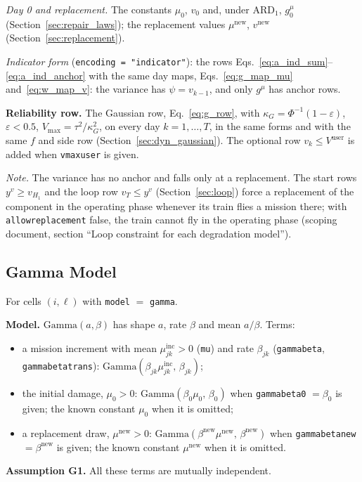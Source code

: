 \documentclass[11pt,a4paper]{article}
\theoremstyle{plain}
\theoremstyle{definition}
\newcommand{\ARDone}{\mathrm{ARD}_{1}}
\newcommand{\inc}{\mathrm{inc}}
\newcommand{\new}{\mathrm{new}}
\renewcommand{\_}{\textunderscore\allowbreak{}}
\begin{document}
\emph{Day 0 and replacement.} The constants $\mu_0$, $v_0$ and, under $\ARDone$,
$g^{\mu}_0$ (Section~\ref{sec:repair_laws}); the replacement values $\mu^{\new}$,
$v^{\new}$ (Section~\ref{sec:replacement}).

\emph{Indicator form} (\texttt{encoding = "indicator"}): the rows
Eqs.~\eqref{eq:a_ind_sum}--\eqref{eq:a_ind_anchor} with the same day maps,
Eqs.~\eqref{eq:g_map_mu} and~\eqref{eq:w_map_v}: the variance has
$\psi = v_{k-1}$, and only $g^{\mu}$ has anchor rows.

\textbf{Reliability row.} The Gaussian row, Eq.~\eqref{eq:g_row}, with
$\kappa_G = \Phi^{-1}(1-\varepsilon)$, $\varepsilon < 0.5$,
$V_{\max} = \tau^2/\kappa_G^2$, on every day $k = 1, \ldots, T$, in the same forms
and with the same $f$ and side row (Section~\ref{sec:dyn_gaussian}). The optional
row $v_k \leq V^{\mathrm{user}}$ is added when \texttt{v\_max\_user} is given.

\emph{Note.} The variance has no anchor and falls only at a replacement. The start rows
$y^v \geq v_{H_1}$ and the loop row $v_T \leq y^v$ (Section~\ref{sec:loop}) force a replacement of the component
in the operating phase whenever its train flies a mission there; with
\texttt{allow\_replacement} false, the train cannot fly in the operating phase
(scoping document, section ``Loop constraint for each degradation model'').

\subsection{Gamma Model}
\label{sec:dyn_gamma}

For cells $(i,\ell)$ with \texttt{model} $=$ \texttt{gamma}.

\textbf{Model.} $\mathrm{Gamma}(a, \beta)$ has shape $a$, rate $\beta$ and mean
$a/\beta$. Terms:
\begin{itemize}[leftmargin=1.5em, nosep]
  \item a mission increment with mean $\mu^{\inc}_{jk} > 0$ (\texttt{mu}) and rate
        $\beta_{jk}$ (\texttt{gamma\_beta}, \texttt{gamma\_beta\_trans}):
        $\mathrm{Gamma}(\beta_{jk}\mu^{\inc}_{jk},\, \beta_{jk})$;
  \item the initial damage, $\mu_0 > 0$: $\mathrm{Gamma}(\beta_0\mu_0,\, \beta_0)$
        when \texttt{gamma\_beta\_0} $= \beta_0$ is given; the known constant
        $\mu_0$ when it is omitted;
  \item a replacement draw, $\mu^{\new} > 0$:
        $\mathrm{Gamma}(\beta^{\new}\mu^{\new},\, \beta^{\new})$ when
        \texttt{gamma\_beta\_new} $= \beta^{\new}$ is given; the known constant
        $\mu^{\new}$ when it is omitted.
\end{itemize}
\textbf{Assumption G1.} All these terms are mutually independent.
\end{document}
